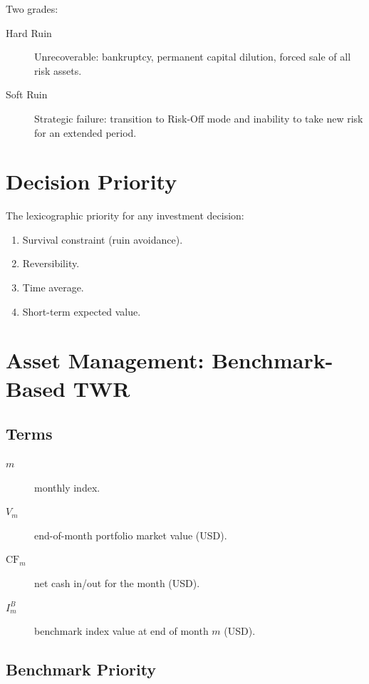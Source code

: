 Two grades:

\begin{description}
\item[Hard Ruin] Unrecoverable: bankruptcy, permanent capital
dilution, forced sale of all risk assets.
\item[Soft Ruin] Strategic failure: transition to Risk-Off mode and
inability to take new risk for an extended period.
\end{description}

\section{Decision Priority}
\label{sec:invest-priority}

The lexicographic priority for any investment decision:

\begin{enumerate}
\item Survival constraint (ruin avoidance).
\item Reversibility.
\item Time average.
\item Short-term expected value.
\end{enumerate}

\section{Asset Management: Benchmark-Based TWR}
\label{sec:invest-twr}

\subsection{Terms}
\label{sec:invest-terms}

\begin{description}
\item[$m$] monthly index.
\item[$V_m$] end-of-month portfolio market value (USD).
\item[$\mathrm{CF}_m$] net cash in/out for the month (USD).
\item[$I_m^B$] benchmark index value at end of month $m$ (USD).
\end{description}

\subsection{Benchmark Priority}
\label{sec:invest-benchmark}

